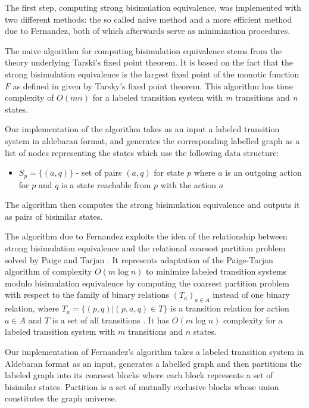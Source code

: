 The first step, computing strong bisimulation equivalence, was implemented with two different methods: the so called
naive method and a more efficient method due to Fernandez, both of which afterwards serve as minimization procedures.

The naive algorithm for computing bisimulation equivalence stems from the theory underlying 
Tarski's fixed point theorem. It is based on the fact that the strong bisimulation equivalence is 
the largest fixed point of the monotic function $F$ as defined in \cite{ReactiveSystems} given by Tarsky's fixed 
point theorem. This algorithm has time complexity of $O(mn)$ for a labeled transition system with \emph{m} transitions and \emph{n} 
states. 

Our implementation of the algorithm takes as an input a labeled transition system in aldebaran format, and generates the corresponding labelled graph as a list of nodes representing the states which use the following data structure:
\begin{itemize}
	\item $S_p=\{(a, q)\}$ - set of pairs $(a, q)$ for state $p$ where $a$ is an outgoing action for $p$ and $q$ is a state
	reachable from $p$ with the action $a$
\end{itemize}
The algorithm then computes the strong bisimulation equivalence and outputs it as pairs of bisimilar states.

The algorithm due to Fernandez exploits the idea of the relationship between strong bisimulation equivalence 
and the relational coarsest partition problem solved by Paige and Tarjan \cite{PaigeTarjan}. It represents adaptation of the 
Paige-Tarjan algorithm of complexity $O(m \log n)$ to minimize labeled transition systems modulo bisimulation 
equivalence by computing the coarsest partition problem with respect to the family of binary relations 
$\left(T_a\right)_{a\in A}$ instead of one binary relation, where $T_a=\{(p,q)|(p,a,q)\in T\}$ is a transition 
relation for action $a\in A$ and $T$ is a set of all transitions \cite{Fernandez}. It has 
$O(m \log n)$ complexity for a labeled transition system with $m$ transitions and $n$ states. 

Our implementation of Fernandez's algorithm takes a labeled transition system in Aldebaran format as an input, generates a labelled graph and 
then partitions the labeled graph into its coarsest blocks where each block represents a set of bisimilar states. Partition 
is a set of mutually exclusive blocks whose union constitutes the graph universe.

